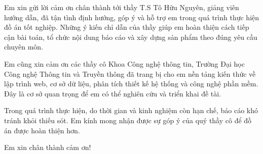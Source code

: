 Em xin gửi lời cảm ơn chân thành tới thầy T.S Tô Hữu Nguyên, giảng viên hướng dẫn, đã tận tình định hướng, góp ý và hỗ trợ em trong quá trình thực hiện đồ án tốt nghiệp. Những ý kiến chỉ dẫn của thầy giúp em hoàn thiện cách tiếp cận bài toán, tổ chức nội dung báo cáo và xây dựng sản phẩm theo đúng yêu cầu chuyên môn.

Em cũng xin cảm ơn các thầy cô Khoa Công nghệ thông tin, Trường Đại học Công nghệ Thông tin và Truyền thông đã trang bị cho em nền tảng kiến thức về lập trình web, cơ sở dữ liệu, phân tích thiết kế hệ thống và công nghệ phần mềm. Đây là cơ sở quan trọng để em có thể nghiên cứu và triển khai đề tài.

Trong quá trình thực hiện, do thời gian và kinh nghiệm còn hạn chế, báo cáo khó tránh khỏi thiếu sót. Em kính mong nhận được sự góp ý của quý thầy cô để đồ án được hoàn thiện hơn.

Em xin chân thành cảm ơn!
